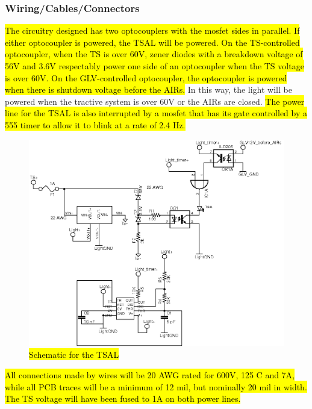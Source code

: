 \documentclass{article}
\DeclareRobustCommand{\hlr}[1]{{\sethlcolor{red}\hl{#1}}}
\begin{document}
        \subsubsection{Wiring/Cables/Connectors}


             \hlr{The circuitry designed has two optocouplers with the mosfet sides in parallel. If either optocoupler is powered, the TSAL will be powered. On the TS-controlled optocoupler, when the TS is over 60V, zener diodes with a breakdown voltage of 56V and 3.6V respectably power one side of an optocoupler when the TS voltage is over 60V. On the GLV-controlled optocoupler, the optocoupler is powered when there is shutdown voltage before the AIRs.} In this way, the light will be powered when the tractive system is over 60V or the AIRs are closed. \hlr{The power line for the TSAL is also interrupted by a mosfet that has its gate controlled by a 555 timer to allow it to blink at a rate of 2.4 Hz.}

            \begin{figure}[H]
            \centering
            \includegraphics[width = 0.7 \textwidth]{TSAL_FSAE}
            \caption{\hlr{Schematic for the TSAL}}
            \label{TSALschem}
            \end{figure}

            \hlr{All connections made by wires will be 20 AWG rated for 600V, 125 \degree C and 7A, while all PCB traces will be a minimum of 12 mil, but nominally 20 mil in width. The TS voltage will have been fused to 1A on both power lines.}
\end{document}

